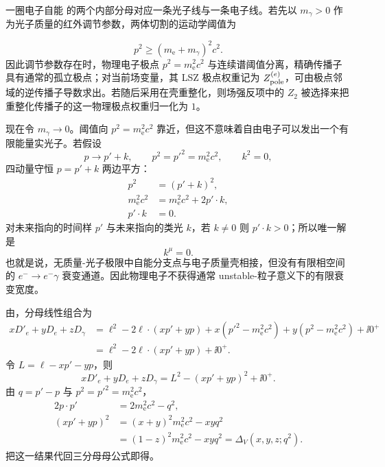 \begin{derivation}[在壳电子为何没有真空衰变宽度]
一圈电子自能  的两个内部分母对应一条光子线与一条电子线。若先以 $m_\gamma>0$ 作为光子质量的红外调节参数，两体切割的运动学阈值为

\begin{equation*}
 p^2\ge (m_{\mathrm e}+m_\gamma)^2c^2.
 \end{equation*}
因此调节参数存在时，物理电子极点 $p^2=m_{\mathrm e}^2c^2$ 与连续谱阈值分离，精确传播子具有通常的孤立极点；对当前场变量，其 LSZ 极点权重记为 $Z_{\rm pole}^{(e)}$，可由极点邻域的逆传播子导数求出。若随后采用在壳重整化，则场强反项中的 $Z_2$ 被选择来把重整化传播子的这一物理极点权重归一化为 $1$。

现在令 $m_\gamma\to0$。阈值向 $p^2=m_{\mathrm e}^2c^2$ 靠近，但这不意味着自由电子可以发出一个有限能量实光子。若假设
\begin{equation*}
 p\to p'+k,
 \qquad
 p^2=p'^2=m_{\mathrm e}^2c^2,
 \qquad
 k^2=0,
\end{equation*}
四动量守恒 $p=p'+k$ 两边平方：
\begin{align*}
 p^2
 &=(p'+k)^2,\\
 m_{\mathrm e}^2c^2
 &=m_{\mathrm e}^2c^2+2p'\!\cdot k,\\
 p'\!\cdot k&=0.
\end{align*}
对未来指向的时间样 $p'$ 与未来指向的类光 $k$，若 $k\neq0$ 则 $p'\!\cdot k>0$；所以唯一解是
\begin{equation*}
 {k^\mu=0.}
 \end{equation*}
也就是说，无质量-光子极限中自能分支点与电子质量壳相接，但没有有限相空间的 $e^-\to e^-\gamma$ 衰变通道。因此物理电子不获得通常 unstable-粒子意义下的有限衰变宽度。
\end{derivation}



\begin{derivation}[一圈顶角的参数化与动量平移]
由，分母线性组合为
\begin{align*}
xD'_e+yD_e+zD_\gamma
&=\ell^2-2\ell\cdot(xp'+yp)
+x(p'^2-m_{\mathrm e}^2c^2)+y(p^2-m_{\mathrm e}^2c^2)+\ii0^+\\
&=\ell^2-2\ell\cdot(xp'+yp)+\ii0^+.
\end{align*}
令 $L=\ell-xp'-yp$，则
\begin{equation*}
xD'_e+yD_e+zD_\gamma
=L^2-(xp'+yp)^2+\ii0^+.
\end{equation*}
由 $q=p'-p$ 与 $p^2=p'^2=m_{\mathrm e}^2c^2$，
\begin{align*}
2p\!\cdot p'&=2m_{\mathrm e}^2c^2-q^2,\\
(xp'+yp)^2
&=(x+y)^2m_{\mathrm e}^2c^2-xyq^2\\
&=(1-z)^2m_{\mathrm e}^2c^2-xyq^2
=\Delta_V(x,y,z;q^2).
\end{align*}
把这一结果代回三分母母公式即得。
\end{derivation}

